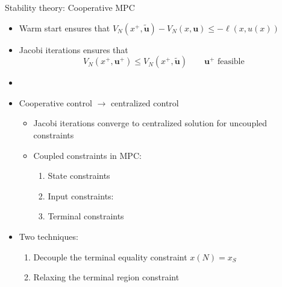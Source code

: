 \documentclass[table]{beamer}
\newcommand\bu {\mathbf{u}}
\begin{document}
\begin{frame}{Stability theory: Cooperative MPC}
\begin{itemize}
\item Warm start ensures that $V_N(x^+,\tilde{\bu}) - V_N(x,\bu) \leq -\ell(x,u(x))$
\item Jacobi iterations ensures that 
  \[ V_N(x^+, \bu^+) \leq V_N(x^+,\tilde{\bu}) \qquad \bu^+
  \text{~feasible}
\]
\item {\color{blue}{Cooperative MPC $\subset$ suboptimal MPC}}
 
\item \alert{Cooperative control $\rightarrow$ centralized control}
\begin{itemize}
  \item Jacobi iterations converge to centralized solution for
    \alert{uncoupled constraints}
  \item Coupled constraints in MPC:
    \begin{enumerate}
      \item State constraints
     \item Input constraints: 
     \item Terminal constraints
   \end{enumerate}
\end{itemize} 
\item Two techniques:
\begin{enumerate}
\item Decouple the terminal equality constraint $x(N) = x_S$
  \citep{stewart:venkat:rawlings:wright:pannocchia:2010} \\
  \centerline{{\color{blue}{Not applicable for supply chain systems}}}  
\item \alert{Relaxing the terminal region constraint}
\end{enumerate}
\end{itemize}
\end{frame}
\end{document}
